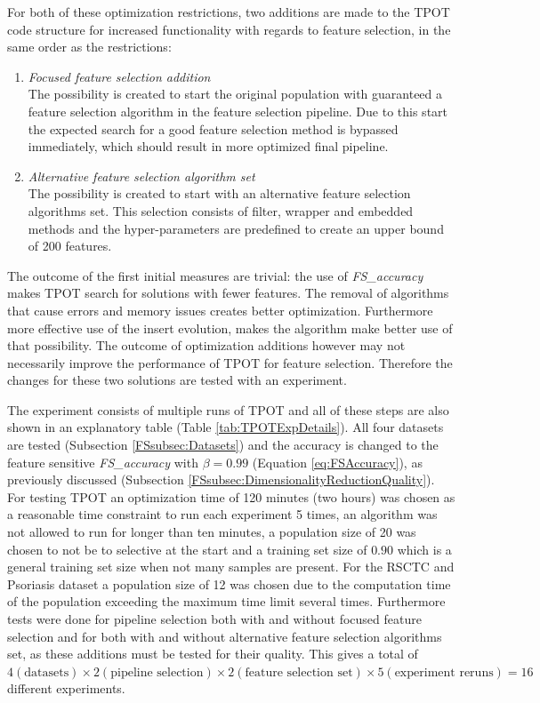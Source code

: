 \documentclass[10pt,a4paper]{report}
\begin{document}
	For both of these optimization restrictions, two additions are made to the TPOT code structure for increased functionality with regards to feature selection, in the same order as the restrictions:
	
	\begin{enumerate}
		\item \textit{Focused feature selection addition} \\
		The possibility is created to start the original population with guaranteed a feature selection algorithm in the feature selection pipeline. Due to this start the expected search for a good feature selection method is bypassed immediately, which should result in more optimized final pipeline.
		\item \textit{Alternative feature selection algorithm set} \\
		The possibility is created to start with an alternative feature selection algorithms set. This selection consists of filter, wrapper and embedded methods and the hyper-parameters are predefined to create an upper bound of 200 features.
	\end{enumerate}
	
	The outcome of the first initial measures are trivial: the use of \textit{FS\_accuracy} makes TPOT search for solutions with fewer features. The removal of algorithms that cause errors and memory issues creates better optimization. Furthermore more effective use of the insert evolution, makes the algorithm make better use of that possibility. The outcome of optimization additions however may not necessarily improve the performance of TPOT for feature selection. Therefore the changes for these two solutions are tested with an experiment. 
	
	The experiment consists of multiple runs of TPOT and all of these steps are also shown in an explanatory table (Table \ref{tab:TPOTExpDetails}). All four datasets are tested (Subsection \ref{FSsubsec:Datasets}) and the accuracy is changed to the feature sensitive \textit{FS\_accuracy} with $\beta = 0.99$ (Equation \ref{eq:FSAccuracy}), as previously discussed (Subsection \ref{FSsubsec:DimensionalityReductionQuality}). For testing TPOT an optimization time of 120 minutes (two hours) was chosen as a reasonable time constraint to run each experiment 5 times, an algorithm was not allowed to run for longer than ten minutes, a population size of 20 was chosen to not be to selective at the start and a training set size of $0.90$ which is a general training set size when not many samples are present. For the RSCTC and Psoriasis dataset a population size of 12 was chosen due to the computation time of the population exceeding the maximum time limit several times. Furthermore tests were done for pipeline selection both with and without focused feature selection  and for both with and without alternative feature selection algorithms set, as these additions must be tested for their quality. This gives a total of $4 (\text{datasets}) \times 2 (\text{pipeline selection}) \times 2 (\text{feature selection set}) \times 5 (\text{experiment reruns}) = 16$ different experiments.
	
\end{document}
